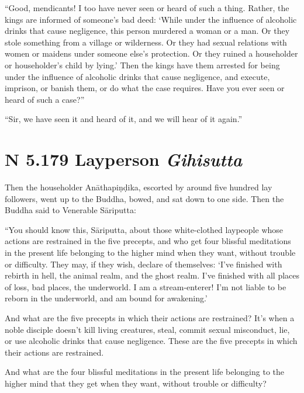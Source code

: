 \documentclass[12pt,openany]{book}%
\newcommand*{\suttatitleacronym}[1]{\smaller[2]{#1}\vspace*{.3em}}
\newcommand*{\suttatitletranslation}[1]{\linebreak{#1}}
\newcommand*{\suttatitleroot}[1]{\linebreak\smaller[2]\itshape{#1}}
\newcommand*{\tocacronym}[1]{\hspace*{-3.3em}{#1}\quad}
\newcommand*{\toctranslation}[1]{#1}
\newcommand*{\tocroot}[1]{(\textit{#1})}
\begin{document}
“Good, mendicants! I too have never seen or heard of such a thing. Rather, the kings are informed of someone’s bad deed: ‘While under the influence of alcoholic drinks that cause negligence, this person murdered a woman or a man. Or they stole something from a village or wilderness. Or they had sexual relations with women or maidens under someone else’s protection. Or they ruined a householder or householder’s child by lying.’ Then the kings have them arrested for being under the influence of alcoholic drinks that cause negligence, and execute, imprison, or banish them, or do what the case requires. Have you ever seen or heard of such a case?” 

“Sir, we have seen it and heard of it, and we will hear of it again.” 

%
\section*{{\suttatitleacronym AN 5.179}{\suttatitletranslation A Layperson }{\suttatitleroot Gihisutta}}
\addcontentsline{toc}{section}{\tocacronym{AN 5.179} \toctranslation{A Layperson } \tocroot{Gihisutta}}

Then the householder \textsanskrit{Anāthapiṇḍika}, escorted by around five hundred lay followers, went up to the Buddha, bowed, and sat down to one side. Then the Buddha said to Venerable \textsanskrit{Sāriputta}: 

“You should know this, \textsanskrit{Sāriputta}, about those white-clothed laypeople whose actions are restrained in the five precepts, and who get four blissful meditations in the present life belonging to the higher mind when they want, without trouble or difficulty. They may, if they wish, declare of themselves: ‘I’ve finished with rebirth in hell, the animal realm, and the ghost realm. I’ve finished with all places of loss, bad places, the underworld. I am a stream-enterer! I’m not liable to be reborn in the underworld, and am bound for awakening.’ 

And what are the five precepts in which their actions are restrained? It’s when a noble disciple doesn’t kill living creatures, steal, commit sexual misconduct, lie, or use alcoholic drinks that cause negligence. These are the five precepts in which their actions are restrained. 

And what are the four blissful meditations in the present life belonging to the higher mind that they get when they want, without trouble or difficulty? 
\end{document}
